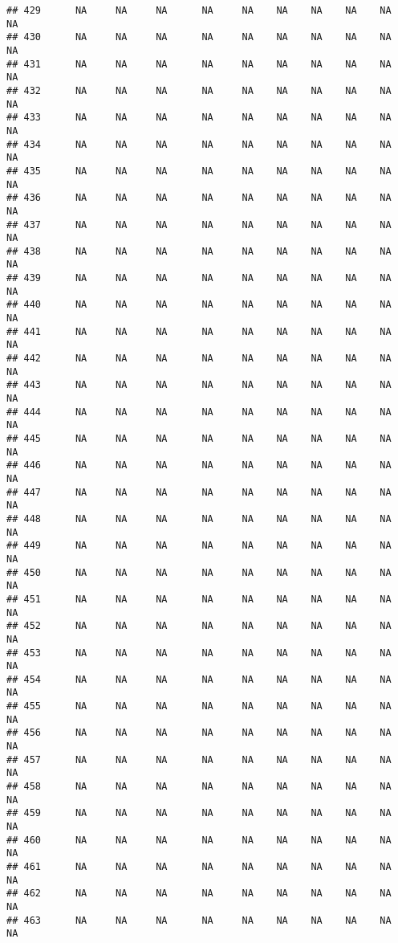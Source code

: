 \documentclass{article}\usepackage{graphicx, color}
\makeatletter
\newenvironment{kframe}{%
 \def\at@end@of@kframe{}%
 \ifinner\ifhmode%
  \def\at@end@of@kframe{\end{minipage}}%
  \begin{minipage}{\columnwidth}%
 \fi\fi%
 \def\FrameCommand##1{\hskip\@totalleftmargin \hskip-\fboxsep
 \colorbox{shadecolor}{##1}\hskip-\fboxsep
     \hskip-\linewidth \hskip-\@totalleftmargin \hskip\columnwidth}%
 \MakeFramed {\advance\hsize-\width
   \@totalleftmargin\z@ \linewidth\hsize
   \@setminipage}}%
 {\par\unskip\endMakeFramed%
 \at@end@of@kframe}
\newenvironment{knitrout}{}{} %
\makeatother
\begin{document}
\begin{knitrout}
\begin{kframe}
\begin{verbatim}
## 429      NA     NA     NA      NA     NA    NA    NA    NA    NA     NA
## 430      NA     NA     NA      NA     NA    NA    NA    NA    NA     NA
## 431      NA     NA     NA      NA     NA    NA    NA    NA    NA     NA
## 432      NA     NA     NA      NA     NA    NA    NA    NA    NA     NA
## 433      NA     NA     NA      NA     NA    NA    NA    NA    NA     NA
## 434      NA     NA     NA      NA     NA    NA    NA    NA    NA     NA
## 435      NA     NA     NA      NA     NA    NA    NA    NA    NA     NA
## 436      NA     NA     NA      NA     NA    NA    NA    NA    NA     NA
## 437      NA     NA     NA      NA     NA    NA    NA    NA    NA     NA
## 438      NA     NA     NA      NA     NA    NA    NA    NA    NA     NA
## 439      NA     NA     NA      NA     NA    NA    NA    NA    NA     NA
## 440      NA     NA     NA      NA     NA    NA    NA    NA    NA     NA
## 441      NA     NA     NA      NA     NA    NA    NA    NA    NA     NA
## 442      NA     NA     NA      NA     NA    NA    NA    NA    NA     NA
## 443      NA     NA     NA      NA     NA    NA    NA    NA    NA     NA
## 444      NA     NA     NA      NA     NA    NA    NA    NA    NA     NA
## 445      NA     NA     NA      NA     NA    NA    NA    NA    NA     NA
## 446      NA     NA     NA      NA     NA    NA    NA    NA    NA     NA
## 447      NA     NA     NA      NA     NA    NA    NA    NA    NA     NA
## 448      NA     NA     NA      NA     NA    NA    NA    NA    NA     NA
## 449      NA     NA     NA      NA     NA    NA    NA    NA    NA     NA
## 450      NA     NA     NA      NA     NA    NA    NA    NA    NA     NA
## 451      NA     NA     NA      NA     NA    NA    NA    NA    NA     NA
## 452      NA     NA     NA      NA     NA    NA    NA    NA    NA     NA
## 453      NA     NA     NA      NA     NA    NA    NA    NA    NA     NA
## 454      NA     NA     NA      NA     NA    NA    NA    NA    NA     NA
## 455      NA     NA     NA      NA     NA    NA    NA    NA    NA     NA
## 456      NA     NA     NA      NA     NA    NA    NA    NA    NA     NA
## 457      NA     NA     NA      NA     NA    NA    NA    NA    NA     NA
## 458      NA     NA     NA      NA     NA    NA    NA    NA    NA     NA
## 459      NA     NA     NA      NA     NA    NA    NA    NA    NA     NA
## 460      NA     NA     NA      NA     NA    NA    NA    NA    NA     NA
## 461      NA     NA     NA      NA     NA    NA    NA    NA    NA     NA
## 462      NA     NA     NA      NA     NA    NA    NA    NA    NA     NA
## 463      NA     NA     NA      NA     NA    NA    NA    NA    NA     NA

\end{verbatim}
\end{kframe}
\end{knitrout}
\end{document}
